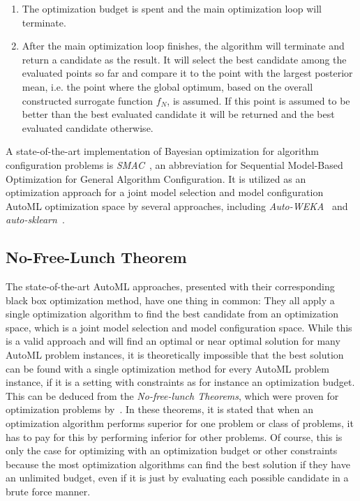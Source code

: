 \begin{enumerate}
    \item The optimization budget is spent and the main optimization loop will terminate.
    \item After the main optimization loop finishes, the algorithm will terminate and return a candidate as the result.
    It will select the best candidate among the evaluated points so far and compare it to the point with the largest posterior mean, i.e. the point where the global optimum, based on the overall constructed surrogate function $f_N$, is assumed.
    If this point is assumed to be better than the best evaluated candidate it will be returned and the best evaluated candidate otherwise.
\end{enumerate}
A state-of-the-art implementation of Bayesian optimization for algorithm configuration problems is \textit{SMAC}~\cite{Hutter-SMAC}, an abbreviation for Sequential Model-Based Optimization for General Algorithm Configuration.
It is utilized as an optimization approach for a joint model selection and model configuration AutoML optimization space by several approaches, including \textit{Auto-WEKA}~\cite{Thornton-AutoWeka} and \textit{auto-sklearn}~\cite{Feurer-AutoSklearn}.

\subsection{No-Free-Lunch Theorem}
\label{sec:theory:optimization:lunch}
The state-of-the-art AutoML approaches, presented with their corresponding black box optimization method, have one thing in common: They all apply a single optimization algorithm to find the best candidate from an optimization space, which is a joint model selection and model configuration space.
While this is a valid approach and will find an optimal or near optimal solution for many AutoML problem instances, it is theoretically impossible that the best solution can be found with a single optimization method for every AutoML problem instance, if it is a setting with constraints as for instance an optimization budget.\newline
This can be deduced from the \textit{No-free-lunch Theorems}, which were proven for optimization problems by~\textcite{Wolpert-No-Free-Lunch-Theorems}.
In these theorems, it is stated that when an optimization algorithm performs superior for one problem or class of problems, it has to pay for this by performing inferior for other problems.
Of course, this is only the case for optimizing with an optimization budget or other constraints because the most optimization algorithms can find the best solution if they have an unlimited budget, even if it is just by evaluating each possible candidate in a brute force manner.

